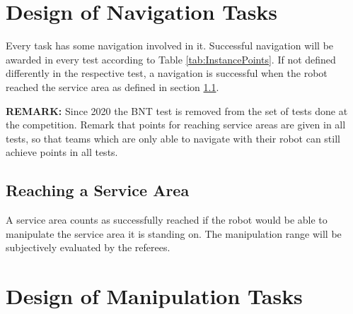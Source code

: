 \section{Design of Navigation Tasks} \label{sec:NavigationTasks}
Every task has some navigation involved in it. Successful navigation will be awarded in every test according to Table \ref{tab:InstancePoints}. If not defined differently in the respective test, a navigation is successful when the robot reached the service area as defined in section \ref{ssec:Navigating}. 

\textbf{REMARK:} Since 2020 the BNT test is removed from the set of tests done at the competition. Remark that points for reaching service areas are given in all tests, so that teams which are only able to navigate with their robot can still achieve points in all tests.


\subsection{Reaching a Service Area} \label{ssec:Navigating}
A service area counts as successfully reached if the robot would be able to manipulate the service area it is standing on. The manipulation range will be subjectively evaluated by the referees.


\section{Design of Manipulation Tasks} \label{sec:ManipulationTasks}


